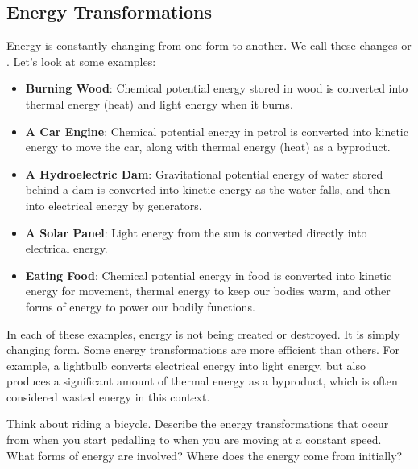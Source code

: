 \subsection{Energy Transformations}

Energy is constantly changing from one form to another. We call these changes  or . Let's look at some examples:

\begin{itemize}
    \item \textbf{Burning Wood}: Chemical potential energy stored in wood is converted into thermal energy (heat) and light energy when it burns.
    \item \textbf{A Car Engine}: Chemical potential energy in petrol is converted into kinetic energy to move the car, along with thermal energy (heat) as a byproduct.
    \item \textbf{A Hydroelectric Dam}: Gravitational potential energy of water stored behind a dam is converted into kinetic energy as the water falls, and then into electrical energy by generators.
    \item \textbf{A Solar Panel}: Light energy from the sun is converted directly into electrical energy.
    \item \textbf{Eating Food}: Chemical potential energy in food is converted into kinetic energy for movement, thermal energy to keep our bodies warm, and other forms of energy to power our bodily functions.
\end{itemize}

In each of these examples, energy is not being created or destroyed. It is simply changing form. Some energy transformations are more efficient than others. For example, a lightbulb converts electrical energy into light energy, but also produces a significant amount of thermal energy as a byproduct, which is often considered wasted energy in this context.

\begin{stopandthink}
Think about riding a bicycle. Describe the energy transformations that occur from when you start pedalling to when you are moving at a constant speed. What forms of energy are involved? Where does the energy come from initially?
\end{stopandthink}

